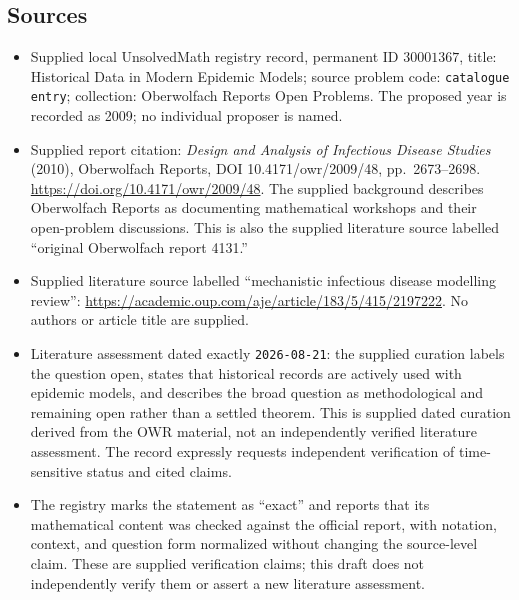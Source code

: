 \documentclass[11pt]{article}
\begin{document}
\subsection{Sources}
\begin{itemize}
\item Supplied local UnsolvedMath registry record, permanent ID \(30001367\), title: Historical Data in Modern Epidemic Models; source problem code: \texttt{catalogue entry}; collection: Oberwolfach Reports Open Problems. The proposed year is recorded as 2009; no individual proposer is named.
\item Supplied report citation: \emph{Design and Analysis of Infectious Disease Studies} (2010), Oberwolfach Reports, DOI 10.4171/owr/2009/48, pp.\ 2673--2698. \url{https://doi.org/10.4171/owr/2009/48}. The supplied background describes Oberwolfach Reports as documenting mathematical workshops and their open-problem discussions. This is also the supplied literature source labelled ``original Oberwolfach report 4131.''
\item Supplied literature source labelled ``mechanistic infectious disease modelling review'': \url{https://academic.oup.com/aje/article/183/5/415/2197222}. No authors or article title are supplied.
\item Literature assessment dated exactly \texttt{2026-08-21}: the supplied curation labels the question open, states that historical records are actively used with epidemic models, and describes the broad question as methodological and remaining open rather than a settled theorem. This is supplied dated curation derived from the OWR material, not an independently verified literature assessment. The record expressly requests independent verification of time-sensitive status and cited claims.
\item The registry marks the statement as ``exact'' and reports that its mathematical content was checked against the official report, with notation, context, and question form normalized without changing the source-level claim. These are supplied verification claims; this draft does not independently verify them or assert a new literature assessment.
\end{itemize}
\end{document}
